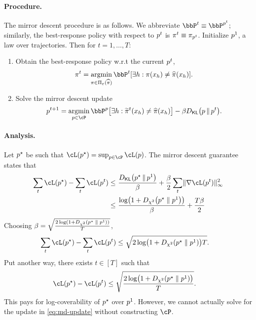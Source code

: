 \documentclass{article}
\let\oldparagraph\paragraph
\renewcommand{\paragraph}[1]{\oldparagraph{#1.}}
\begin{document}
\paragraph{Procedure} 
The mirror descent procedure is as follows. We abbreviate $\bbP\ind{t} \equiv \bbP^{p\ind{t}}$; similarly, the best-response policy with respect to $p^{t}$ is $\pi^{t} \equiv \pi_{p^{t}}$.  
Initialize $p^{1}$, a law over trajectories. Then for $t = 1,\ldots,T$: 
\begin{enumerate}
  \item Obtain the best-response policy w.r.t the current $p^{t}$,
  \begin{align*}
    \pi\ind{t} = \argmin_{\pi\in\Pi_\veps(\pihat)}{}\bbP\ind{t}\sbr*{\exists h : \pi(x_h) \neq \pihat(x_h)}.
  \end{align*}
  \item Solve the mirror descent update 
  \begin{align}
  \label{eq:md-update}
    p\ind{t+1} = \argmin_{p \in \cP}{} \bbP^p\sbr*{\exists h : \wt\pi\ind{t}(x_h) \neq \pihat(x_h)} - \beta \Dkl{p}{p\ind{t}}. 
  \end{align}
\end{enumerate}

\paragraph{Analysis}
Let $p^\star$ be such that $\cL(\pstar) = \sup_{p \in \cP} \cL(p)$. The mirror descent guarantee states that  
\begin{align*}
  \sum_t \cL(\pstar) - \sum_t \cL(p^t) 
  \le&~ 
  \frac{\Dkl{\pstar}{p\ind{1}}}{\beta} + \frac{\beta}{2} \sum_t \nrm{\nabla \cL(p\ind{t})}_\infty^2
  \\
  \le&~ \frac{\log\prn*{1+\Dchis{\pstar}{p\ind{1}}}}{\beta} + \frac{T\beta}{2} 
\end{align*}
Choosing $\beta = \sqrt{\frac{2\log(1+D_{\chi^2}\left(p^\star\;\|\;{}p^{1}\right))}{T}}$,  
\begin{align*}
  \sum_t \cL(\pstar) - \sum_t \cL(p^t) 
  \le&~ 
  \sqrt{2\log\prn*{1+\Dchis{\pstar}{p\ind{1}}}T}. 
\end{align*}
Put another way, there exists $t \in [T]$ such that 
\begin{align*}
  \cL(\pstar) - \cL(p^t) 
  \le&~ 
  \sqrt{\frac{2\log\prn*{1+\Dchis{\pstar}{p\ind{1}}}}{T}}. 
\end{align*}
This pays for log-coverability of $p^\star$ over $p^{1}$. However, we cannot actually solve for the update in \cref{eq:md-update} without constructing $\cP$.   
\end{document}
